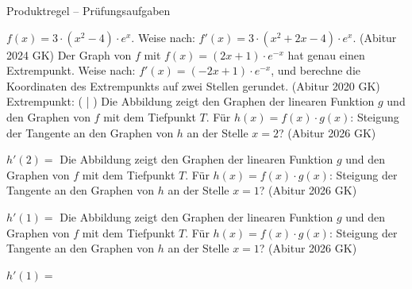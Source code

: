\begin{aufgabe}{Produktregel – Prüfungsaufgaben}
\begin{teile}
\teil $f(x) = 3 \cdot (x^2 - 4) \cdot e^x$. Weise nach: $f'(x) = 3 \cdot (x^2 + 2x - 4) \cdot e^x$. \hfill (Abitur 2024 GK)
\teil Der Graph von $f$ mit $f(x) = (2x + 1) \cdot e^{-x}$ hat genau einen Extrempunkt. Weise nach: $f'(x) = (-2x + 1) \cdot e^{-x}$, und berechne die Koordinaten des Extrempunkts auf zwei Stellen gerundet. \hfill (Abitur 2020 GK) \\ Extrempunkt: ( \leerfeld | \leerfeld )
\teil Die Abbildung zeigt den Graphen der linearen Funktion $g$ und den Graphen von $f$ mit dem Tiefpunkt $T$. Für $h(x) = f(x) \cdot g(x)$: Steigung der Tangente an den Graphen von $h$ an der Stelle $x = 2$? \hfill (Abitur 2026 GK) \\

\begin{ksys}[xmin=-1,xmax=6,ymin=-2,ymax=6,ablesen]    \end{ksys}
$h'(2) =$ \leerfeld
\teil Die Abbildung zeigt den Graphen der linearen Funktion $g$ und den Graphen von $f$ mit dem Tiefpunkt $T$. Für $h(x) = f(x) \cdot g(x)$: Steigung der Tangente an den Graphen von $h$ an der Stelle $x = 1$? \hfill (Abitur 2026 GK) \\

\begin{ksys}[xmin=-2,xmax=5,ymin=-4,ymax=5,ablesen]    \end{ksys}
$h'(1) =$ \leerfeld
\teil Die Abbildung zeigt den Graphen der linearen Funktion $g$ und den Graphen von $f$ mit dem Tiefpunkt $T$. Für $h(x) = f(x) \cdot g(x)$: Steigung der Tangente an den Graphen von $h$ an der Stelle $x = 1$? \hfill (Abitur 2026 GK) \\

\begin{ksys}[xmin=-1,xmax=4,ymin=-1,ymax=7,ablesen]    \end{ksys}
$h'(1) =$ \leerfeld
\end{teile}
\end{aufgabe}
